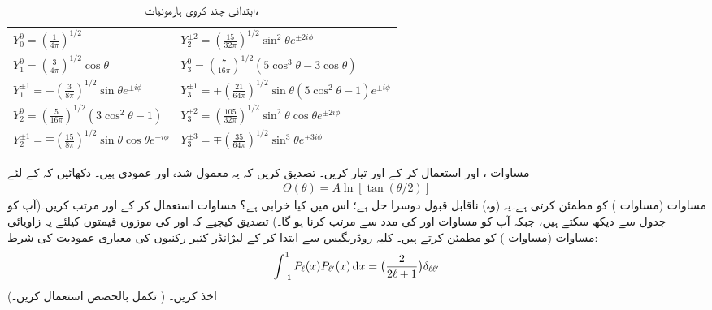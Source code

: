 \begin{table}
\caption{ابتدائی چند کروی ہارمونیات، }
\label{جدول_ابعادی_کروی_ہارمونیات}
\renewcommand{\arraystretch}{2} 
\centering
\begin{tabular}{ll}
$Y_0^0=(\frac{1}{4\pi})^{1/2}$ & $Y_2^{\pm 2}=(\frac{15}{32\pi})^{1/2}\sin^2\theta e^{\pm 2 i \phi}$\\
$Y_1^0=(\frac{3}{4\pi})^{1/2}\cos\theta$ & $Y_3^0=(\frac{7}{16\pi})^{1/2}(5\cos^3\theta-3\cos\theta)$\\
$Y_1^{\pm 1}=\mp(\frac{3}{8\pi})^{1/2}\sin\theta e^{\pm i\phi}$ & $Y_3^{\pm 1}=\mp(\frac{21}{64\pi})^{1/2}\sin\theta(5\cos^2\theta-1)e^{\pm i\phi}$\\
$Y_2^0=(\frac{5}{16\pi})^{1/2}(3\cos^2\theta-1)$ & $Y_3^{\pm 2}=(\frac{105}{32\pi})^{1/2}\sin^2\theta\cos\theta e^{\pm 2 i \phi}$\\
$Y_2^{\pm 1}=\mp(\frac{15}{8\pi})^{1/2}\sin\theta\cos\theta e^{\pm i\phi}$ & $Y_3^{\pm3}=\mp(\frac{35}{64\pi})^{1/2}\sin^3\theta e^{\pm 3 i \phi}$
\end{tabular}
\end{table}
مساوات ،  اور  استعمال 
کر کے  اور  تیار کریں۔ تصدیق کریں کہ یہ معمول شدہ اور عمودی ہیں۔
%
دکھائیں کہ  کے لئے
\begin{align*}
\Theta(\theta)=A\ln[\tan(\theta/2)] 
\end{align*}
 مساوات  (مساوات ) کو مطمئن کرتی ہے۔یہ (وہ) ناقابل قبول دوسرا حل ہے؛ اس میں کیا خرابی ہے؟
%
مساوات  استعمال کر کے  اور 
 مرتب کریں۔(آپ  کو  جدول  سے دیکھ سکتے ہیں، جبکہ  آپ کو مساوات  اور  کی مدد سے  مرتب کرنا  ہو گا۔) تصدیق کیجیے کہ   اور  کی موزوں قیمتوں کیلئے یہ زاویائی مساوات (مساوات ) کو  مطمئن کرتے ہیں۔
%
کلیہ روڈریگیس سے ابتدا کر کے  لیژانڈر  کثیر رکنیوں کی معیاری عمودیت کی شرط:
\begin{align}\label{مساوات_تین_عمودیت_لیژانڈر}
\int_{-1}^{1}P_{\ell}(x)P_{\ell'}(x)\dif x=\big(\frac{2}{2\ell+1}\big)\delta_{\ell\ell'} 
\end{align}
اخذ کریں۔ ( تکمل بالحصص استعمال کریں۔)


